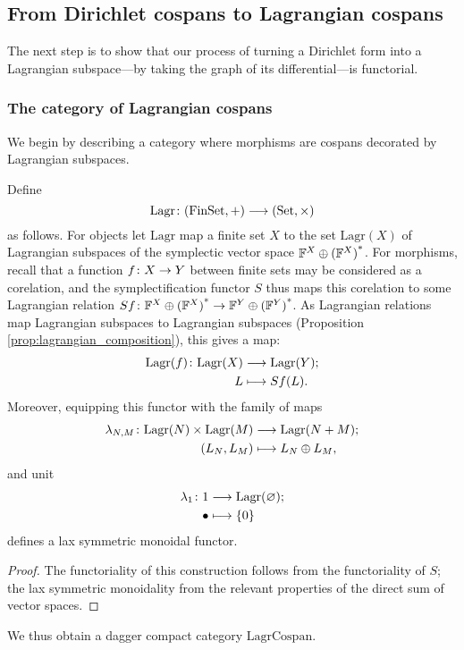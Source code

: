 \subsection{From Dirichlet cospans to Lagrangian cospans}

The next step is to show that our process of turning a Dirichlet form into a Lagrangian subspace---by taking the graph of its differential---is functorial.

\subsubsection*{The category of Lagrangian cospans}

We begin by describing a category where morphisms are cospans decorated by
Lagrangian subspaces.

\begin{proposition}
Define 
\[
  \mathrm{Lagr}{\colon} (\mathrm{FinSet},+) \longrightarrow (\mathrm{Set},\times)
\]
as follows. For objects let $\mathrm{Lagr}$ map a finite set $X$ to the set
$\mathrm{Lagr}(X)$ of Lagrangian subspaces of the symplectic vector space
${{\mathbb F}^{X} \oplus {({\mathbb F}^{X})}^\ast}$.  For morphisms, recall that a function $f{\colon} X \to Y$ between
finite sets may be considered as a corelation, and the symplectification functor
$S$ thus maps this corelation to some Lagrangian relation $Sf{\colon} {{\mathbb F}^{X} \oplus {({\mathbb F}^{X})}^\ast}
\to {{\mathbb F}^{Y} \oplus {({\mathbb F}^{Y})}^\ast}$. As Lagrangian relations map Lagrangian subspaces to Lagrangian
subspaces (Proposition \ref{prop:lagrangian_composition}), this gives a map: 
\begin{align*}
  \mathrm{Lagr}(f){\colon} \mathrm{Lagr}(X) &\longrightarrow \mathrm{Lagr}(Y); \\
  L &\longmapsto Sf(L).
\end{align*}
Moreover, equipping this functor with the family of maps
\begin{align*}
  \lambda_{N,M}{\colon} \mathrm{Lagr}(N) \times \mathrm{Lagr}(M) &\longrightarrow
  \mathrm{Lagr}(N+M);\\
  (L_N,L_M) &\longmapsto L_N \oplus L_M,
\end{align*}
and unit
\begin{align*}
  \lambda_1{\colon} 1 &\longrightarrow \mathrm{Lagr}(\varnothing);\\
  \bullet &\longmapsto \{0\}
\end{align*}
defines a lax symmetric monoidal functor.
\end{proposition}
\begin{proof}
  The functoriality of this construction follows from the functoriality of $S$;
  the lax symmetric monoidality from the relevant properties of the direct sum
  of vector spaces.
\end{proof}
We thus obtain a dagger compact category $\mathrm{LagrCospan}$.

